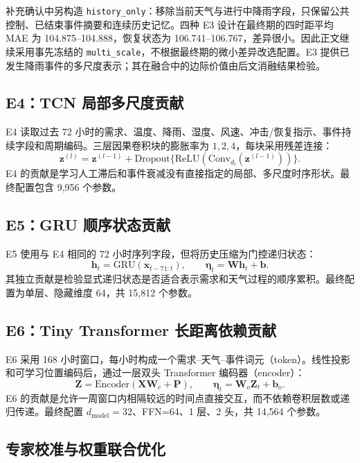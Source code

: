 \documentclass[UTF8,11pt,a4paper]{ctexart}
\begin{document}
补充确认中另构造 \texttt{history\_only}：移除当前天气与进行中降雨字段，只保留公共控制、已结束事件摘要和连续历史记忆。四种 E3 设计在最终期的四时距平均 MAE 为 104.875--104.888，恢复状态为 106.741--106.767，差异很小。因此正文继续采用事先冻结的 \texttt{multi\_scale}，不根据最终期的微小差异改选配置。E3 提供已发生降雨事件的多尺度表示；其在融合中的边际价值由后文消融结果检验。

\subsection{E4：TCN 局部多尺度贡献}

E4 读取过去 72 小时的需求、温度、降雨、湿度、风速、冲击/恢复指示、事件持续字段和周期编码。三层因果卷积块的膨胀率为 $1,2,4$，每块采用残差连接：
\begin{equation}
  \bm z^{(l)}=\bm z^{(l-1)}+\mathrm{Dropout}\{\mathrm{ReLU}(\mathrm{Conv}_{d_l}(\bm z^{(l-1)}))\}.
\end{equation}
E4 的贡献是学习人工滞后和事件衰减没有直接指定的局部、多尺度时序形状。最终配置包含 9,956 个参数。

\subsection{E5：GRU 顺序状态贡献}

E5 使用与 E4 相同的 72 小时序列字段，但将历史压缩为门控递归状态：
\begin{equation}
  \bm h_t=\mathrm{GRU}(\bm x_{t-71:t}),\qquad
  \bm\eta_t=\bm W\bm h_t+\bm b.
\end{equation}
其独立贡献是检验显式递归状态是否适合表示需求和天气过程的顺序累积。最终配置为单层、隐藏维度 64，共 15,812 个参数。

\subsection{E6：Tiny Transformer 长距离依赖贡献}

E6 采用 168 小时窗口，每小时构成一个需求--天气--事件词元（token）。线性投影和可学习位置编码后，通过一层双头 Transformer 编码器（encoder）：
\begin{equation}
  \bm Z=\mathrm{Encoder}(\bm X\bm W_e+\bm P),\qquad
  \bm\eta_t=\bm W_o\bm Z_{t}+\bm b_o.
\end{equation}
E6 的贡献是允许一周窗口内相隔较远的时间点直接交互，而不依赖卷积层数或递归传递。最终配置 $d_{\text{model}}=32$、FFN=64、1 层、2 头，共 14,564 个参数。

\subsection{专家校准与权重联合优化}
\end{document}
